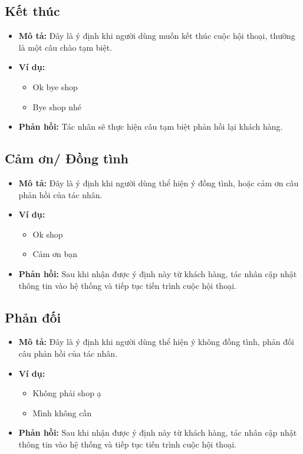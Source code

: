 \subsection{Kết thúc}
\begin{itemize}
    \item \textbf{Mô tả:} Đây là ý định khi người dùng muốn kết thúc
    cuộc hội thoại, thường là một câu chào tạm biệt.
    \item \textbf{Ví dụ:}
    \begin{itemize}
        \item Ok bye shop
        \item Bye shop nhé
    \end{itemize}
    \item \textbf{Phản hồi:} Tác nhân sẽ thực hiện câu tạm biệt
    phản hồi lại khách hàng.
\end{itemize}

\subsection{Cảm ơn/ Đồng tình}
\begin{itemize}
    \item \textbf{Mô tả:} Đây là ý định khi người dùng thể hiện ý
    đồng tình, hoặc cảm ơn câu phản hồi của tác nhân.
    \item \textbf{Ví dụ:}
    \begin{itemize}
        \item Ok shop
        \item Cảm ơn bạn
    \end{itemize}
    \item \textbf{Phản hồi:} Sau khi nhận được ý định này từ
    khách hàng, tác nhân cập nhật thông tin vào hệ thống và tiếp tục
    tiến trình cuộc hội thoại.
\end{itemize}

\subsection{Phản đối}
\begin{itemize}
    \item \textbf{Mô tả:} Đây là ý định khi người dùng thể hiện ý
    không đồng tình, phản đối câu phản hồi của tác nhân.
    \item \textbf{Ví dụ:}
    \begin{itemize}
        \item Không phải shop ạ
        \item Mình không cần
    \end{itemize}
    \item \textbf{Phản hồi:} Sau khi nhận được ý định này từ
    khách hàng, tác nhân cập nhật thông tin vào hệ thống và
    tiếp tục tiến trình cuộc hội thoại.
\end{itemize}

